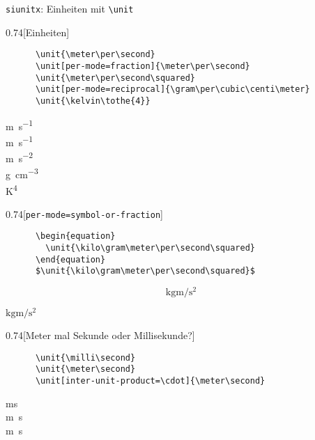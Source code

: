 \begin{frame}[fragile]{\texttt{siunitx}: Einheiten mit \texttt{\backslash unit}}
  \begin{CodeExample}{0.74}[Einheiten]
    \begin{verbatim}
      \unit{\meter\per\second}
      \unit[per-mode=fraction]{\meter\per\second}
      \unit{\meter\per\second\squared}
      \unit[per-mode=reciprocal]{\gram\per\cubic\centi\meter}
      \unit{\kelvin\tothe{4}}
    \end{verbatim}
  \CodeResult
    \strut
    \unit{\meter\per\second} \\
    \unit[per-mode=fraction]{\meter\per\second} \\
    \unit{\meter\per\second\squared} \\
    \unit[per-mode=reciprocal]{\gram\per\cubic\centi\meter} \\
    \unit{\kelvin\tothe{4}}
  \end{CodeExample}
  \begin{CodeExample}{0.74}[\texttt{per-mode=symbol-or-fraction}]
    \begin{verbatim}
      \begin{equation}
        \unit{\kilo\gram\meter\per\second\squared}
      \end{equation}
      $\unit{\kilo\gram\meter\per\second\squared}$
    \end{verbatim}
  \CodeResult
    \removedisplayskip
    \begin{minipage}[c][3\baselineskip][c]{\textwidth}
      \begin{equation}
        \unit{\kilo\gram\meter\per\second\squared}
      \end{equation}
    \end{minipage}
    $\unit{\kilo\gram\meter\per\second\squared}$
  \end{CodeExample}
  \begin{CodeExample}{0.74}[Meter mal Sekunde oder Millisekunde?]
    \begin{verbatim}
      \unit{\milli\second}
      \unit{\meter\second}
      \unit[inter-unit-product=\cdot]{\meter\second}
    \end{verbatim}
  \CodeResult
    \strut
    \unit{\milli\second} \\
    \unit{\meter\second} \\
    \unit[inter-unit-product=\cdot]{\meter\second}
  \end{CodeExample}
\end{frame}

